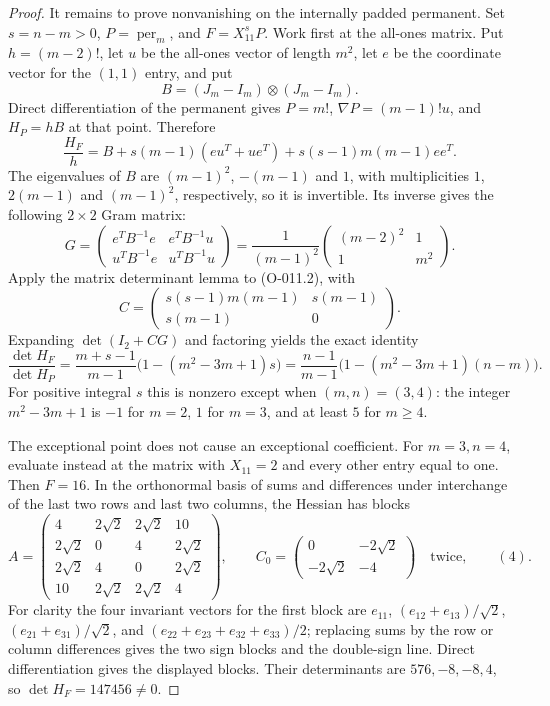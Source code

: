 \begin{proof}
It remains to prove nonvanishing on the internally padded permanent.
Set $s=n-m>0$, $P=\operatorname{per}_m$, and $F=X_{11}^sP$.
Work first at the all-ones matrix. Put $h=(m-2)!$, let $u$ be
the all-ones vector of length $m^2$, let $e$ be the coordinate
vector for the $(1,1)$ entry, and put
\[
 B=(J_m-I_m)\otimes(J_m-I_m).
\]
Direct differentiation of the permanent gives
$P=m!$, $\nabla P=(m-1)!u$, and $H_P=hB$ at that point.
Therefore
\[
 \frac{H_F}{h}
   =B+s(m-1)(eu^T+ue^T)+s(s-1)m(m-1)ee^T.              \tag{O-011.2}
\]
The eigenvalues of $B$ are $(m-1)^2$, $-(m-1)$ and $1$, with
multiplicities $1$, $2(m-1)$ and $(m-1)^2$, respectively, so it
is invertible. Its inverse gives the following $2\times2$ Gram matrix:
\[
 G=\begin{pmatrix}e^TB^{-1}e&e^TB^{-1}u\\
                  u^TB^{-1}e&u^TB^{-1}u\end{pmatrix}
   =\frac1{(m-1)^2}
       \begin{pmatrix}(m-2)^2&1\\1&m^2\end{pmatrix}.
\]
Apply the matrix determinant lemma to (O-011.2), with
\[
 C=\begin{pmatrix}s(s-1)m(m-1)&s(m-1)\\s(m-1)&0\end{pmatrix}.
\]
Expanding $\det(I_2+CG)$ and factoring yields the exact identity
\[
 \frac{\det H_F}{\det H_P}
  =\frac{m+s-1}{m-1}\bigl(1-(m^2-3m+1)s\bigr)
  =\frac{n-1}{m-1}\bigl(1-(m^2-3m+1)(n-m)\bigr).       \tag{O-011.3}
\]
For positive integral $s$ this is nonzero except when $(m,n)=(3,4)$:
the integer $m^2-3m+1$ is $-1$ for $m=2$, $1$ for $m=3$,
and at least $5$ for $m\geq4$.

The exceptional point does not cause an exceptional coefficient.
For $m=3,n=4$, evaluate instead at the matrix with $X_{11}=2$
and every other entry equal to one. Then $F=16$. In the
orthonormal basis of sums and differences under interchange of the
last two rows and last two columns, the Hessian has blocks
\[
 A=\begin{pmatrix}
 4&2\sqrt2&2\sqrt2&10\\
 2\sqrt2&0&4&2\sqrt2\\
 2\sqrt2&4&0&2\sqrt2\\
 10&2\sqrt2&2\sqrt2&4
 \end{pmatrix},\qquad
 C_0=\begin{pmatrix}0&-2\sqrt2\\-2\sqrt2&-4\end{pmatrix}
 \quad\text{twice},\qquad (4).
\]
For clarity the four invariant vectors for the first block are
$e_{11}$, $(e_{12}+e_{13})/\sqrt2$,
$(e_{21}+e_{31})/\sqrt2$, and
$(e_{22}+e_{23}+e_{32}+e_{33})/2$; replacing sums by the
row or column differences gives the two sign blocks and the
double-sign line. Direct differentiation gives the displayed
blocks. Their determinants are $576,-8,-8,4$, so
$\det H_F=147456\ne0$.


\end{proof}
